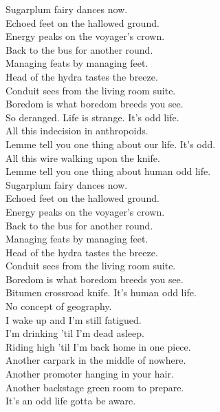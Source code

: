 Sugarplum fairy dances now. \\
Echoed feet on the hallowed ground. \\
Energy peaks on the voyager's crown. \\
Back to the bus for another round. \\
Managing feats by managing feet. \\
Head of the hydra tastes the breeze. \\
Conduit sees from the living room suite. \\
Boredom is what boredom breeds you see. \\

So deranged. Life is strange. It's  odd life. \\

All this indecision in anthropoids. \\
Lemme tell you one thing about our life. It's odd. \\
All this wire walking upon the knife. \\
Lemme tell you one thing about human odd life. \\

Sugarplum fairy dances now. \\
Echoed feet on the hallowed ground. \\
Energy peaks on the voyager's crown. \\
Back to the bus for another round. \\
Managing feats by managing feet. \\
Head of the hydra tastes the breeze. \\
Conduit sees from the living room suite. \\
Boredom is what boredom breeds you see. \\

Bitumen crossroad knife. It's human odd life. \\

No concept of geography. \\
I wake up and I'm still fatigued. \\
I'm drinking 'til I'm dead asleep. \\
Riding high 'til I'm back home in one piece. \\
Another carpark in the middle of nowhere. \\
Another promoter hanging in your hair. \\
Another backstage green room to prepare. \\
It's an odd life gotta be aware. \\

